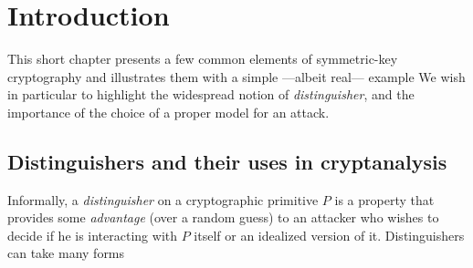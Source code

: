 %



\label{chap:emrka}


\section{Introduction}

This short chapter presents a few common elements of symmetric-key cryptography and illustrates them with a simple ---albeit real--- example
We wish in particular to highlight the widespread notion of \emph{distinguisher}, and the importance of the choice of a proper model for an attack.
 
\begin{center}
\aldineleft
\end{center}

\subsection{Distinguishers and their uses in cryptanalysis}
Informally, a \emph{distinguisher} on a cryptographic primitive $P$ is a property that provides some \emph{advantage} (over a random guess)
to an attacker who wishes to decide if he is interacting with $P$ itself or an idealized version of it. Distinguishers can take many
forms


